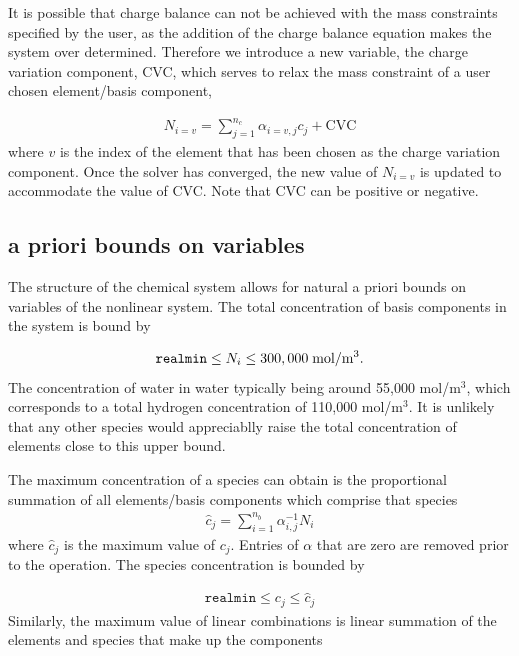 \documentclass{article}
\begin{document}
It is possible that charge balance can not be achieved with the mass constraints specified by the user, as the addition of the charge balance equation makes the system over determined. Therefore we introduce a new variable, the charge variation component, CVC, which serves to relax the mass constraint of a user chosen element/basis component, 

\begin{align}
    N_{i=v} = \sum_{j=1}^{n_c} \alpha_{i=v,j} c_j + \mathrm{CVC}
\end{align}
where $v$ is the index of the element that has been chosen as the charge variation component. Once the solver has converged, the new value of $N_{i=v}$ is updated to accommodate the value of CVC. Note that CVC can be positive or negative.

\subsection{a priori bounds on variables}

The structure of the chemical system allows for natural a priori bounds on variables of the nonlinear system. 
The total concentration of basis components in the system is bound by 

\begin{align}
    \texttt{realmin} \leq N_i \leq 300,000 \text{\;mol/m$^3$}.
\end{align}
The concentration of water in water typically being around 55,000 mol/m$^3$, which corresponds to a total hydrogen concentration of 110,000 mol/m$^3$. It is unlikely that any other species would appreciablly raise the total concentration of elements close to this upper bound.

The maximum concentration of a species can obtain is the proportional summation of all elements/basis components which comprise that species
\begin{align}
   \hat{c}_j = \sum_{i=1}^{n_b} \alpha_{i,j}^{-1}N_i 
\end{align}
where $\hat{c}_j$ is the maximum value of $c_j$. Entries of $\alpha$ that are zero are removed prior to the operation. The species concentration is bounded by

\begin{align}
    \texttt{realmin} \leq c_j \leq  \hat{c}_j
\end{align}
 Similarly, the maximum value of linear combinations is linear summation of the elements and species that make up the components
\end{document}

